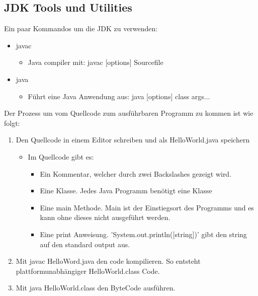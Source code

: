 \documentclass{article}
\begin{document}
	\subsection{JDK Tools und Utilities}
	Ein paar Kommandos um die JDK zu verwenden:
	\begin{itemize}
		\item{javac}
		\begin{itemize}
			\item{Java compiler mit: javac [options] Sourcefile}
		\end{itemize}
		\item{java}
		\begin{itemize}
			\item{Führt eine Java Anwendung aus: java [options] class args...}
		\end{itemize}
	\end{itemize}
	Der Prozess um vom Quellcode zum ausführbaren Programm zu kommen ist wie folgt:
	\begin{enumerate}
		\item{Den Quellcode in einem Editor schreiben und als HelloWorld.java speichern}
		\begin{itemize}
			\item{Im Quellcode gibt es:}
			\begin{itemize}
				\item{Ein Kommentar, welcher durch zwei Backslashes gezeigt wird.}
				\item{Eine Klasse. Jedes Java Programm benötigt eine Klasse}
				\item{Eine main Methode. Main ist der Einstiegsort des Programms und es kann ohne dieses nicht ausgeführt werden.}
				\item{Eine print Anweisung. 'System.out.println([string])' gibt den string auf den standard output aus.}
			\end{itemize}
		\end{itemize}
		\item{Mit javac HelloWord.java den code kompilieren. So entsteht plattformunabhängiger HelloWorld.class Code.}
		\item{Mit java HelloWorld.class den ByteCode ausführen.}
	\end{enumerate}
\end{document}
